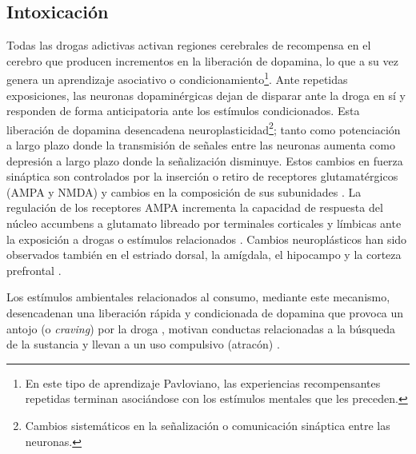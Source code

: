 \subsection{Intoxicación}
\label{intox}
Todas las drogas adictivas activan regiones cerebrales de recompensa en el cerebro que producen incrementos en la liberación de dopamina, lo que a su vez genera un aprendizaje asociativo o condicionamiento\footnote{En este tipo de aprendizaje Pavloviano, las experiencias recompensantes repetidas terminan asociándose con los estímulos mentales que les preceden.}.
Ante repetidas exposiciones, las neuronas dopaminérgicas dejan de disparar ante la droga en sí y responden de forma anticipatoria ante los estímulos condicionados. Esta liberación de dopamina desencadena neuroplasticidad\footnote{Cambios sistemáticos en la señalización o comunicación sináptica entre las neuronas.}; tanto como potenciación a largo plazo \textemdash donde la transmisión de señales entre las neuronas aumenta como depresión a largo plazo \textemdash donde la señalización disminuye. Estos cambios en fuerza sináptica son controlados por la inserción o retiro de receptores glutamatérgicos (AMPA y NMDA) y cambios en la composición de sus subunidades \parencite{Volkow2016}. La regulación de los receptores AMPA incrementa la capacidad de respuesta del núcleo accumbens a glutamato libreado por terminales corticales y límbicas ante la exposición a drogas o estímulos relacionados \parencite{Wolf2010}. Cambios neuroplásticos han sido observados también en el estriado dorsal, la amígdala, el hipocampo y la corteza prefrontal \parencite{Volkow2016}.\par
Los estímulos ambientales relacionados al consumo, mediante este mecanismo, desencadenan una liberación rápida y condicionada de dopamina que provoca un antojo (o \textit{craving}) por la droga \parencite{Volkow2006}, motivan conductas relacionadas a la búsqueda de la sustancia y llevan a un uso compulsivo (atracón) \parencite{Volkow2016}.

